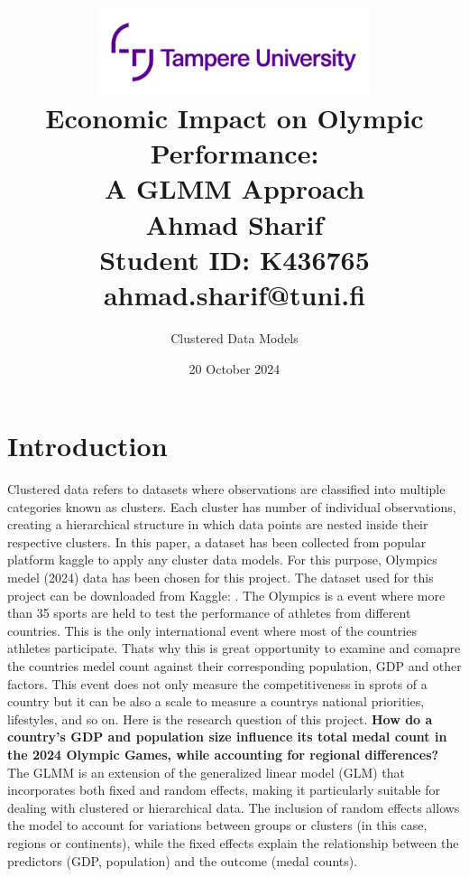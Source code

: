 \documentclass[a4paper,12pt]{article}
\title{
    \vspace{2cm}
    \includegraphics[width=0.6\textwidth]{images/logo.png}\\[2cm]
    \textbf{Economic Impact on Olympic Performance:}\\
    \textbf{A GLMM Approach}\\[2cm]
    \vfill
    \large Ahmad Sharif\\
    Student ID: K436765\\
    ahmad.sharif@tuni.fi\\
    \vspace{2cm}
}
\author{Clustered Data Models}
\date{20 October 2024}
\begin{document}
\maketitle
\newpage

\tableofcontents
\newpage








\section{Introduction}
Clustered data refers to datasets where observations are classified into multiple categories known as clusters. Each cluster has number of individual observations, creating a hierarchical structure in which data points are nested inside their respective clusters.
\newline
\newline
In this paper, a dataset has been collected from popular platform kaggle to apply any cluster data models. For this purpose, Olympics medel (2024) data has been chosen for this project.
\newline
\newline
The dataset used for this project can be downloaded from Kaggle: \cite{KaggleData}.
\newline
\newline
The Olympics is a event where more than 35 sports are held to test the performance of athletes from different countries. This is the only international event where most of the countries athletes participate. Thats why this is great opportunity to examine and comapre the countries medel count against their corresponding population, GDP and other factors. This event does not only measure the competitiveness in sprots of a country but it can be also a scale to measure a countrys national priorities, lifestyles, and so on.
\newline
\newline
Here is the research question of this project.
\newline
\textbf{How do a country's GDP and population size influence its total medal count in the 2024 Olympic Games, while accounting for regional differences?}
\newline
\newline
 The GLMM is an extension of the generalized linear model (GLM) that incorporates both fixed and random effects, making it particularly suitable for dealing with clustered or hierarchical data. The inclusion of random effects allows the model to account for variations between groups or clusters (in this case, regions or continents), while the fixed effects explain the relationship between the predictors (GDP, population) and the outcome (medal counts).
\end{document}

